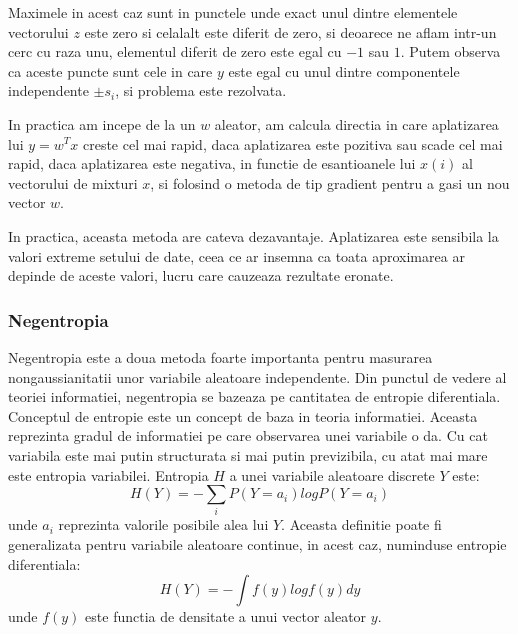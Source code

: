 \documentclass[12pt]{article}
\begin{document}
Maximele in acest caz sunt in punctele unde exact unul dintre elementele vectorului $z$ este zero si celalalt este diferit de zero, si deoarece ne aflam intr-un cerc cu raza unu, elementul diferit de zero este egal cu $-1$ sau $1$. Putem observa ca aceste puncte sunt cele in care $y$ este egal cu unul dintre componentele independente $\pm s_i$, si problema este rezolvata.

In practica am incepe de la un $w$ aleator, am calcula directia in care aplatizarea lui $y=w^Tx$ creste cel mai rapid, daca aplatizarea este pozitiva sau scade cel mai rapid, daca aplatizarea este negativa, in functie de esantioanele lui $x(i)$ al vectorului de mixturi $x$, si folosind o metoda de tip gradient pentru a gasi un nou vector $w$.

In practica, aceasta metoda are cateva dezavantaje. Aplatizarea este sensibila la valori extreme setului de date, ceea ce ar insemna ca toata aproximarea ar depinde de aceste valori, lucru care cauzeaza rezultate eronate.

\subsubsection{Negentropia}
Negentropia este a doua metoda foarte importanta pentru masurarea nongaussianitatii unor variabile aleatoare independente. Din punctul de vedere al teoriei informatiei, negentropia se bazeaza pe cantitatea de entropie diferentiala. Conceptul de entropie este un concept de baza in teoria informatiei. Aceasta reprezinta gradul de informatiei pe care observarea unei variabile o da. Cu cat variabila este mai putin structurata si mai putin previzibila, cu atat mai mare este entropia variabilei. Entropia $H$ a unei variabile aleatoare discrete $Y$ este:
\begin{equation}
	H(Y)=-\sum_i P(Y=a_i)log P(Y=a_i)
\end{equation}
unde $a_i$ reprezinta valorile posibile alea lui $Y$. Aceasta definitie poate fi generalizata pentru variabile aleatoare continue, in acest caz, numinduse entropie diferentiala:
\begin{equation}
H(Y)=-\int f(y) logf(y)dy	
\end{equation}
unde $f(y)$ este functia de densitate a unui vector aleator $y$.
\end{document}

